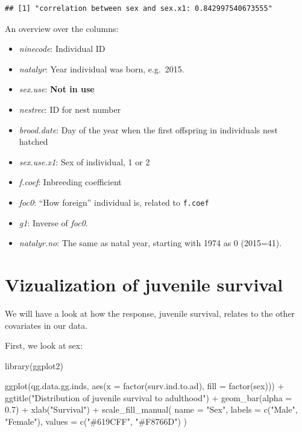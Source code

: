 \documentclass[
]{article}
\newenvironment{Shaded}{\begin{snugshade}}{\end{snugshade}}
\newcommand{\AttributeTok}[1]{\textcolor[rgb]{0.77,0.63,0.00}{#1}}
\newcommand{\FloatTok}[1]{\textcolor[rgb]{0.00,0.00,0.81}{#1}}
\newcommand{\FunctionTok}[1]{\textcolor[rgb]{0.00,0.00,0.00}{#1}}
\newcommand{\NormalTok}[1]{#1}
\newcommand{\SpecialCharTok}[1]{\textcolor[rgb]{0.00,0.00,0.00}{#1}}
\newcommand{\StringTok}[1]{\textcolor[rgb]{0.31,0.60,0.02}{#1}}
\providecommand{\tightlist}{%
  \setlength{\itemsep}{0pt}\setlength{\parskip}{0pt}}
\begin{document}
\begin{verbatim}
## [1] "correlation between sex and sex.x1: 0.842997540673555"
\end{verbatim}

An overview over the columns:

\begin{itemize}
\tightlist
\item
  \emph{ninecode}: Individual ID
\item
  \emph{natalyr}: Year individual was born, e.g.~2015.
\item
  \emph{sex.use}: \textbf{Not in use}
\item
  \emph{nestrec}: ID for nest number
\item
  \emph{brood.date}: Day of the year when the first offspring in
  individuals nest hatched
\item
  \emph{sex.use.x1}: Sex of individual, 1 or 2
\item
  \emph{f.coef}: Inbreeding coefficient
\item
  \emph{foc0}: ``How foreign'' individual is, related to \texttt{f.coef}
\item
  \emph{g1}: Inverse of \emph{foc0}.
\item
  \emph{natalyr.no}: The same as natal year, starting with 1974 as 0
  (2015=41).
\end{itemize}

\hypertarget{vizualization-of-juvenile-survival}{%
\section*{Vizualization of juvenile
survival}\label{vizualization-of-juvenile-survival}}

We will have a look at how the response, juvenile survival, relates to
the other covariates in our data.

First, we look at sex:

\begin{Shaded}
\begin{Highlighting}[]
\FunctionTok{library}\NormalTok{(ggplot2)}

\FunctionTok{ggplot}\NormalTok{(qg.data.gg.inds, }\FunctionTok{aes}\NormalTok{(}\AttributeTok{x =} \FunctionTok{factor}\NormalTok{(surv.ind.to.ad),}
                            \AttributeTok{fill =} \FunctionTok{factor}\NormalTok{(sex))) }\SpecialCharTok{+}
  \FunctionTok{ggtitle}\NormalTok{(}\StringTok{"Distribution of juvenile survival to adulthood"}\NormalTok{) }\SpecialCharTok{+}
  \FunctionTok{geom\_bar}\NormalTok{(}\AttributeTok{alpha =} \FloatTok{0.7}\NormalTok{) }\SpecialCharTok{+}
  \FunctionTok{xlab}\NormalTok{(}\StringTok{"Survival"}\NormalTok{) }\SpecialCharTok{+}
  \FunctionTok{scale\_fill\_manual}\NormalTok{(}
    \AttributeTok{name =} \StringTok{"Sex"}\NormalTok{,}
    \AttributeTok{labels =} \FunctionTok{c}\NormalTok{(}\StringTok{"Male"}\NormalTok{, }\StringTok{"Female"}\NormalTok{),}
    \AttributeTok{values =} \FunctionTok{c}\NormalTok{(}\StringTok{"\#619CFF"}\NormalTok{, }\StringTok{"\#F8766D"}\NormalTok{)}
\NormalTok{  )}
\end{Highlighting}
\end{Shaded}
\end{document}
